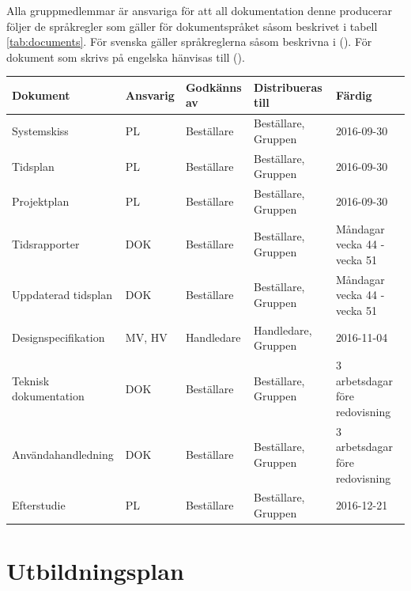 \documentclass[a4paper,11pt]{article}
\begin{document}
Alla gruppmedlemmar är ansvariga för att all dokumentation denne producerar följer de språkregler som gäller för dokumentspråket såsom beskrivet i tabell \ref{tab:documents}. För svenska gäller språkreglerna såsom beskrivna i  (\cite{Sprakradet2008}). För dokument som skrivs på engelska hänvisas till  (\cite{Ritter2003}).


\label{tab:documents}
\begin{flushleft}
    \begin{tabular}{|L{90pt}|L{40pt} |L{60pt} |L{100pt} |L{100pt} |}
    	\hline
    	Dokument              & Ansvarig & Godkänns av & Distribueras till   & Färdig                         \\ \hline
    	Systemskiss           & PL       & Beställare  & Beställare, Gruppen & 2016-09-30                     \\ \hline
    	Tidsplan              & PL       & Beställare  & Beställare, Gruppen & 2016-09-30                     \\ \hline
    	Projektplan           & PL       & Beställare  & Beställare, Gruppen & 2016-09-30                     \\ \hline
    	Tidsrapporter         & DOK      & Beställare  & Beställare, Gruppen & Måndagar vecka 44 - vecka 51   \\ \hline
    	Uppdaterad tidsplan   & DOK      & Beställare  & Beställare, Gruppen & Måndagar vecka 44 - vecka 51   \\ \hline
    	Designspecifikation   & MV, HV   & Handledare  & Handledare, Gruppen & 2016-11-04                     \\ \hline
    	Teknisk dokumentation & DOK      & Beställare  & Beställare, Gruppen & 3 arbetsdagar före redovisning \\ \hline
    	Användahandledning    & DOK      & Beställare  & Beställare, Gruppen & 3 arbetsdagar före redovisning \\ \hline
    	Efterstudie           & PL       & Beställare  & Beställare, Gruppen & 2016-12-21                     \\ \hline
    \end{tabular}
\end{flushleft}

\section{Utbildningsplan}
\end{document}
